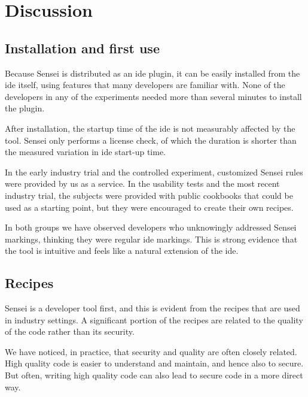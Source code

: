 \section{Discussion}
\label{sec:eval-sensei}
\subsection{Installation and first use}
Because Sensei is distributed as an \gls{ide} plugin, it can be easily installed from the \gls{ide} itself, using features that many developers are familiar with.
None of the developers in any of the experiments needed more than several minutes to install the plugin.

After installation, the startup time of the \gls{ide} is not measurably affected by the tool.
Sensei only performs a license check, of which the duration is shorter than the measured variation in \gls{ide} start-up time.

In the early industry trial and the controlled experiment, customized Sensei rules were provided by us as a service.
In the usability tests and the most recent industry trial, the subjects were provided with public cookbooks that could be used as a starting point, but they were encouraged to create their own recipes.

In both groups we have observed developers who unknowingly addressed Sensei markings, thinking they were regular \gls{ide} markings.
This is strong evidence that the tool is intuitive and feels like a natural extension of the \gls{ide}.

\subsection{Recipes}
Sensei is a developer tool first, and this is evident from the recipes that are used in industry settings.
A significant portion of the recipes are related to the quality of the code rather than its security.

We have noticed, in practice, that security and quality are often closely related.
High quality code is easier to understand and maintain, and hence also to secure.
But often, writing high quality code can also lead to secure code in a more direct way.

